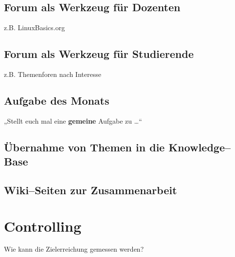 \subsection{Forum als Werkzeug für Dozenten} %
\label{sub:forum_als_werkzeug_fur_dozenten}
z.B. LinuxBasics.org

\subsection{Forum als Werkzeug für Studierende} %
\label{sub:forum_als_werkzeug_fur_studierende}
z.B. Themenforen nach Interesse

\subsection{Aufgabe des Monats} %
\label{sub:aufgabe_des_monats}

„Stellt euch mal eine \textbf{gemeine} Aufgabe zu …“

\subsection{Übernahme von Themen in die Knowledge--Base} %
\label{sub:ubernahme_von_themen_in_die_knowledge_base}


\subsection{Wiki--Seiten zur Zusammenarbeit} %
\label{sub:wiki_seiten_zur_zusammenarbeit}



\section{Controlling} %
\label{sec:controlling}
Wie kann die Zielerreichung gemessen werden?
